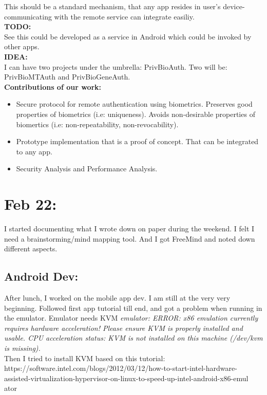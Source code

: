 \documentclass[11pt]{article}
\begin{document}
This should be a standard mechanism, that any app resides in user's device-communicating with the remote service can integrate easiliy.\\
\textbf{TODO:}\\
See this could be developed as a service in Android which could be invoked by other apps.\\

\textbf{IDEA:}\\
I can have two projects under the umbrella: PrivBioAuth. Two will be: PrivBioMTAuth and PrivBioGeneAuth.\\

\textbf{Contributions of our work:}
\begin{itemize}
 \item Secure protocol for remote authentication using biometrics. Preserves good properties of biometrics (i.e: uniqueness). Avoids non-desirable 
properties of biomertics (i.e: non-repeatability, non-revocability).
 \item Prototype implementation that is a proof of concept. That can be integrated to any app.
 \item Security Analysis and Performance Analysis.
\end{itemize}


\section*{Feb 22:}
I started documenting what I wrote down on paper during the weekend. I felt I need a brainstorming/mind mapping tool. And I got FreeMind and noted 
down different aspects.\\

\subsection*{Android Dev:}
After lunch, I worked on the mobile app dev. I am still at the very very beginning. Followed first app tutorial till end, and got a problem when 
running in the emulator. Emulator needs KVM \textit{emulator: ERROR: x86 emulation currently requires hardware acceleration!
Please ensure KVM is properly installed and usable.
CPU acceleration status: KVM is not installed on this machine (/dev/kvm is missing).} \\

Then I tried to install KVM based on this tutorial:\\
https://software.intel.com/blogs/2012/03/12/how-to-start-intel-hardware-assisted-virtualization-hypervisor-on-linux-to-speed-up-intel-android-x86-emul
ator
\end{document}

